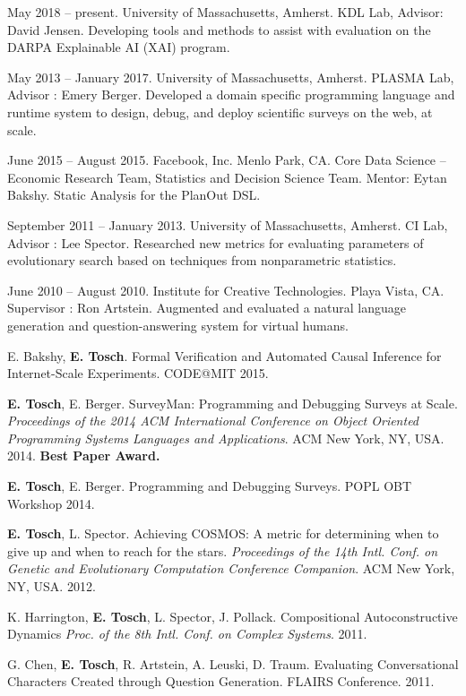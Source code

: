 \documentclass[10pt]{article}
\newcommand{\cvsec}[2]{
    \begin{tcolorbox}[width=\textwidth, breakable, title={#1}]
        #2
    \end{tcolorbox}
    \vspace{10pt}
}
\begin{document}
\cvsec{Research Experience}{
  \begin{description}[leftmargin=1cm]
  \item[Research Assistant.] May 2018 -- present. University of Massachusetts, Amherst. KDL Lab, Advisor: David Jensen. Developing tools and methods to assist with evaluation on the DARPA Explainable  AI (XAI) program.  
  \item[Research Assistant.] May 2013 -- January 2017. University of Massachusetts, Amherst. PLASMA Lab, Advisor : Emery Berger. Developed a domain specific programming language and runtime system to design, debug, and deploy scientific surveys on the web, at scale.
  \item[Research Intern.] June 2015 -- August 2015. Facebook, Inc. Menlo Park, CA. Core Data Science -- Economic Research Team, Statistics and Decision Science Team. Mentor: Eytan Bakshy. Static Analysis for the PlanOut DSL. 
  \item[Research Assistant.] September 2011 -- January 2013. University of Massachusetts, Amherst. CI Lab, Advisor : Lee Spector. Researched new metrics for evaluating parameters of evolutionary search based on techniques from nonparametric statistics.
  \item[Visiting Researcher.] June 2010 -- August 2010. Institute for Creative Technologies. Playa Vista, CA. Supervisor : Ron Artstein. Augmented and evaluated a natural language generation and question-answering system for virtual humans.
\end{description}
}

\cvsec{Publications}{
\hangindent=1cm E. Bakshy, {\bf E. Tosch}. Formal Verification and Automated Causal Inference for Internet-Scale Experiments. CODE@MIT 2015.

\hangindent=1cm {\bf E. Tosch}, E. Berger. SurveyMan: Programming and Debugging Surveys at Scale. \emph{Proceedings of the 2014 ACM International Conference on Object Oriented Programming Systems Languages and Applications}. ACM New York, NY, USA. 2014. {\bf Best Paper Award.}

\hangindent=1cm {\bf E. Tosch}, E. Berger. Programming and Debugging Surveys. POPL OBT Workshop 2014.

\hangindent=1cm {\bf E. Tosch}, L. Spector. Achieving COSMOS: A metric for determining when to give up and when to reach for the stars. \emph{Proceedings of the 14th Intl. Conf. on Genetic and Evolutionary Computation Conference Companion}. ACM New York, NY, USA. 2012.

\hangindent=1cm K. Harrington, {\bf E. Tosch}, L. Spector, J. Pollack. Compositional Autoconstructive Dynamics \emph{Proc. of the 8th Intl. Conf. on Complex Systems}. 2011.

\hangindent=1cm G. Chen, {\bf E. Tosch}, R. Artstein, A. Leuski, D. Traum. Evaluating Conversational Characters Created through Question Generation. FLAIRS Conference. 2011.
}
\end{document}
